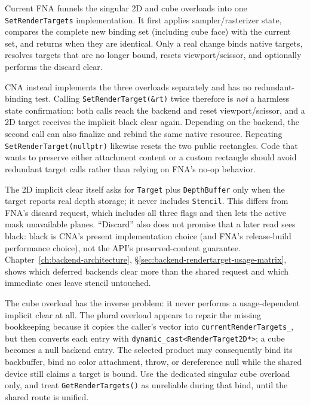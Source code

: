 Current FNA funnels the singular 2D and cube overloads into one
\texttt{SetRenderTargets} implementation. It first applies sampler/rasterizer state, compares
the complete new binding set (including cube face) with the current set, and returns when they
are identical. Only a real change binds native targets, resolves targets that are no longer
bound, resets viewport/scissor, and optionally performs the discard clear.

CNA instead implements the three overloads separately and has no redundant-binding test.
Calling \texttt{SetRenderTarget(\&rt)} twice therefore is \emph{not} a harmless state
confirmation: both calls reach the backend and reset viewport/scissor, and a
 2D target receives the implicit black clear
again. Depending on the backend, the second call can also finalize and rebind the same native
resource. Repeating \texttt{SetRenderTarget(nullptr)} likewise resets the two public
rectangles. Code that wants to preserve either attachment content or a custom rectangle should
avoid redundant target calls rather than relying on FNA's no-op behavior.

The 2D implicit clear itself asks for \texttt{Target} plus \texttt{DepthBuffer} only when the
target reports real depth storage; it never includes \texttt{Stencil}. This differs from FNA's
discard request, which includes all three flags and then lets the active
 mask unavailable planes. ``Discard'' also does not promise that a later
read sees black: black is CNA's present implementation choice (and FNA's release-build
performance choice), not the API's preserved-content guarantee. Chapter~\ref{ch:backend-architecture},
\S\ref{sec:backend-rendertarget-usage-matrix}, shows which deferred backends clear more than
the shared request and which immediate ones leave stencil untouched.

The cube overload has the inverse problem: it never performs a usage-dependent implicit clear
at all. The plural overload appears to repair the missing bookkeeping because it copies the
caller's  vector into \texttt{currentRenderTargets\_}, but then
converts each entry with \texttt{dynamic\_cast<RenderTarget2D*>}; a cube becomes a null backend
entry. The selected product may consequently bind its backbuffer, bind no color attachment,
throw, or dereference null while the shared device still claims a target is bound. Use the
dedicated singular cube overload only, and treat \texttt{GetRenderTargets()} as unreliable
during that bind, until the shared route is unified.

